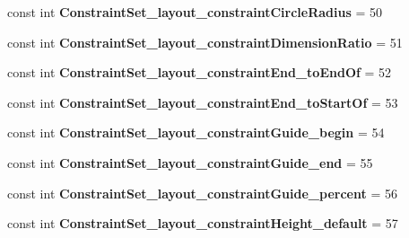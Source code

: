 \begin{DoxyCompactItemize}
\item 
\mbox{\label{classst_delivery_1_1_resource_1_1_styleable_af6df8a1a2bb4d1bca909a255a02875f6}} 
const int {\bfseries Constraint\+Set\+\_\+layout\+\_\+constraint\+Circle\+Radius} = 50
\item 
\mbox{\label{classst_delivery_1_1_resource_1_1_styleable_a94dd80259f75b91c7f1afbab6d35ee00}} 
const int {\bfseries Constraint\+Set\+\_\+layout\+\_\+constraint\+Dimension\+Ratio} = 51
\item 
\mbox{\label{classst_delivery_1_1_resource_1_1_styleable_a7bdde82ae6f0550061154290a8f9ad28}} 
const int {\bfseries Constraint\+Set\+\_\+layout\+\_\+constraint\+End\+\_\+to\+End\+Of} = 52
\item 
\mbox{\label{classst_delivery_1_1_resource_1_1_styleable_a12d38a11d30effec3d4c7f6ad375f108}} 
const int {\bfseries Constraint\+Set\+\_\+layout\+\_\+constraint\+End\+\_\+to\+Start\+Of} = 53
\item 
\mbox{\label{classst_delivery_1_1_resource_1_1_styleable_acd430f12036c9ed94a626d637b42914d}} 
const int {\bfseries Constraint\+Set\+\_\+layout\+\_\+constraint\+Guide\+\_\+begin} = 54
\item 
\mbox{\label{classst_delivery_1_1_resource_1_1_styleable_a38558763b11870f18fa4bdcb1428a445}} 
const int {\bfseries Constraint\+Set\+\_\+layout\+\_\+constraint\+Guide\+\_\+end} = 55
\item 
\mbox{\label{classst_delivery_1_1_resource_1_1_styleable_a8325d82ca331214f39f106a552618814}} 
const int {\bfseries Constraint\+Set\+\_\+layout\+\_\+constraint\+Guide\+\_\+percent} = 56
\item 
\mbox{\label{classst_delivery_1_1_resource_1_1_styleable_a9231d6901d41ca6d221fb625118d0402}} 
const int {\bfseries Constraint\+Set\+\_\+layout\+\_\+constraint\+Height\+\_\+default} = 57
\item 

\end{DoxyCompactItemize}
